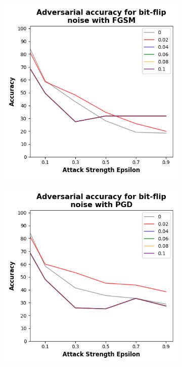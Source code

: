 \begin{figure}[!h]
  \centering

  \begin{subfigure}{0.45\textwidth}
      \includegraphics[width=\linewidth]{figures/evaluation_results/breast-cancer/pqc/figures/bit-flip-fgsm.png}
      \label{fig:bc7}
  \end{subfigure} \qquad
  \begin{subfigure}{0.45\textwidth}
      \includegraphics[width=\linewidth]{figures/evaluation_results/breast-cancer/pqc/figures/bit-flip-pgd.png}

\end{subfigure}
\end{figure}

